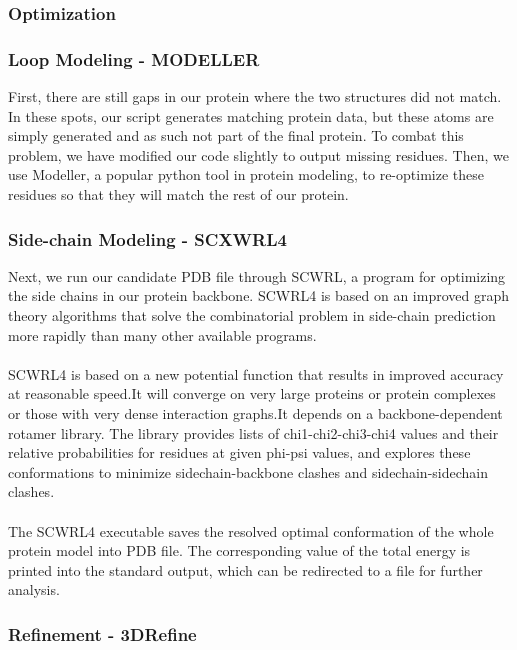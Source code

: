 \documentclass{article}
\begin{document}
\subsubsection{Optimization}


\subsubsection*{Loop Modeling - MODELLER}

First, there are still gaps in our protein where the two structures did not match. In these spots, our script generates matching protein data, but these atoms are simply generated and as such not part of the final protein. To combat this problem, we have modified our code slightly to output missing residues. Then, we use Modeller, a popular python tool in protein modeling, to re-optimize these residues so that they will match the rest of our protein.


\subsubsection*{Side-chain Modeling - SCXWRL4}

Next, we run our candidate PDB file through SCWRL, a program for optimizing the side chains in our protein backbone. SCWRL4 is based on an improved graph theory algorithms that solve the combinatorial problem in side-chain prediction more rapidly than many other available programs.\\\\
SCWRL4 is based on a new potential function that results in improved accuracy at reasonable speed.It will converge on very large proteins or protein complexes or those with very dense interaction graphs.It depends on a backbone-dependent rotamer library. The library provides lists of chi1-chi2-chi3-chi4 values and their relative probabilities for residues at given phi-psi values, and explores these conformations to minimize sidechain-backbone clashes and sidechain-sidechain clashes.\\\\
The SCWRL4 executable saves the resolved optimal conformation of the whole protein model into PDB file. The corresponding value of the total energy is printed into the standard output, which can be redirected to a file for further analysis.


\subsubsection*{Refinement - 3DRefine}
\end{document}
